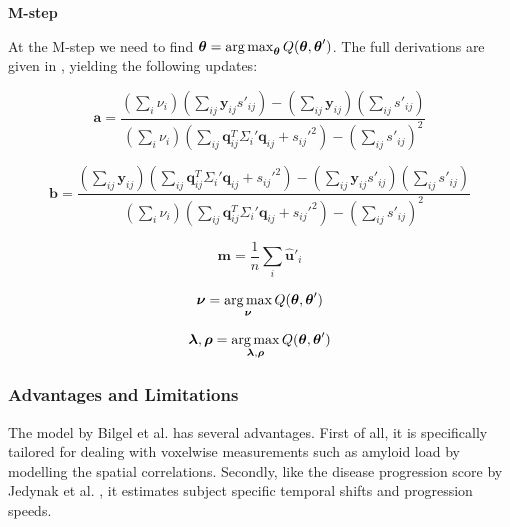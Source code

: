 \textbf{M-step}

At the M-step we need to find $\boldsymbol{\theta} = \operatorname*{arg\,max}_{\boldsymbol{\theta}}Q(\boldsymbol{\theta}, \boldsymbol{\theta}')$. The full derivations are given in \cite{bilgel2016multivariate}, yielding the following updates:

\begin{equation}
\label{eq:bilgel_mstep1}
 \textbf{a} = \frac{\left( \sum_i \nu_i \right) \left( \sum_{ij} \textbf{y}_{ij}s'_{ij} \right) - \left( \sum_{ij} \textbf{y}_{ij} \right) \left( \sum_{ij}s'_{ij} \right)}{\left( \sum_i \nu_i \right) \left( \sum_{ij} \textbf{q}_{ij}^T \Sigma_i' \textbf{q}_{ij} + s_{ij}'^2 \right) - \left( \sum_{ij}s'_{ij} \right)^2}
\end{equation}

\begin{equation}
\label{eq:bilgel_mstep2}
 \textbf{b} = \frac{\left( \sum_{ij} \textbf{y}_{ij} \right) \left( \sum_{ij} \textbf{q}_{ij}^T \Sigma_i' \textbf{q}_{ij} + s_{ij}'^2 \right) - \left( \sum_{ij} \textbf{y}_{ij}s'_{ij} \right) \left( \sum_{ij} s'_{ij} \right)}{\left( \sum_i \nu_i \right) \left( \sum_{ij} \textbf{q}_{ij}^T \Sigma_i' \textbf{q}_{ij} + s_{ij}'^2 \right) - \left( \sum_{ij}s'_{ij} \right)^2}
\end{equation}

\begin{equation}
 \textbf{m} = \frac{1}{n}\sum_i \hat{\textbf{u}}'_i
\end{equation}

\begin{equation}
 \boldsymbol{\nu} = \operatorname*{arg\,max}_{\boldsymbol{\nu}} Q(\boldsymbol{\theta}, \boldsymbol{\theta}')
\end{equation}

\begin{equation}
 \boldsymbol{\lambda}, \boldsymbol{\rho} = \operatorname*{arg\,max}_{\boldsymbol{\lambda}, \boldsymbol{\rho}} Q(\boldsymbol{\theta}, \boldsymbol{\theta}')
\end{equation}

\subsubsection{Advantages and Limitations}

The model by Bilgel et al. \cite{bilgel2016multivariate} has several advantages. First of all, it is specifically tailored for dealing with voxelwise measurements such as amyloid load by modelling the spatial correlations. Secondly, like the disease progression score by Jedynak et al. \cite{jedynak2012computational}, it estimates subject specific temporal shifts and progression speeds. 

